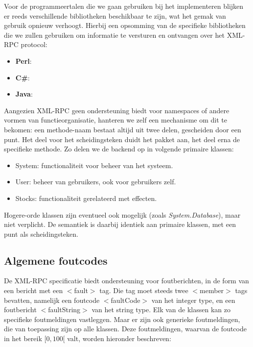 Voor de programmeertalen die we gaan gebruiken bij het implementeren blijken er reeds verschillende bibliotheken beschikbaar te zijn, wat het gemak van gebruik opnieuw verhoogt. Hierbij een opsomming van de specifieke bibliotheken die we zullen gebruiken om informatie te versturen en ontvangen over het XML-RPC protocol:
\begin{itemize}
\item{\textbf{Perl}: }
\item{\textbf{C\#}: }
\item{\textbf{Java}: }
\end{itemize}

Aangezien XML-RPC geen ondersteuning biedt voor namespaces of andere vormen van functieorganisatie, hanteren we zelf een mechanisme om dit te bekomen: een methode-naam bestaat altijd uit twee delen, gescheiden door een punt. Het deel voor het scheidingsteken duidt het pakket aan, het deel erna de specifieke methode.
Zo delen we de backend op in volgende primaire klassen:
\begin{itemize}
\item{System: functionaliteit voor beheer van het systeem.}
\item{User: beheer van gebruikers, ook voor gebruikers zelf.}
\item{Stocks: functionaliteit gerelateerd met effecten.}
\end{itemize}
Hogere-orde klassen zijn eventueel ook mogelijk (zoals \emph{System.Database}), maar niet verplicht. De semantiek is daarbij identiek aan primaire klassen, met een punt als scheidingsteken.

\subsection{Algemene foutcodes}

De XML-RPC specificatie biedt ondersteuning voor foutberichten, in de form van een bericht met een $<$fault$>$ tag. Die tag moet steeds twee $<$member$>$ tags bevatten, namelijk een foutcode $<$faultCode$>$ van het integer type, en een foutbericht $<$faultString$>$ van het string type. Elk van de klassen kan zo specifieke foutmeldingen vastleggen.
Maar er zijn ook generieke foutmeldingen, die van toepassing zijn op alle klassen. Deze foutmeldingen, waarvan de foutcode in het bereik $[0, 100[$ valt, worden hieronder beschreven:

